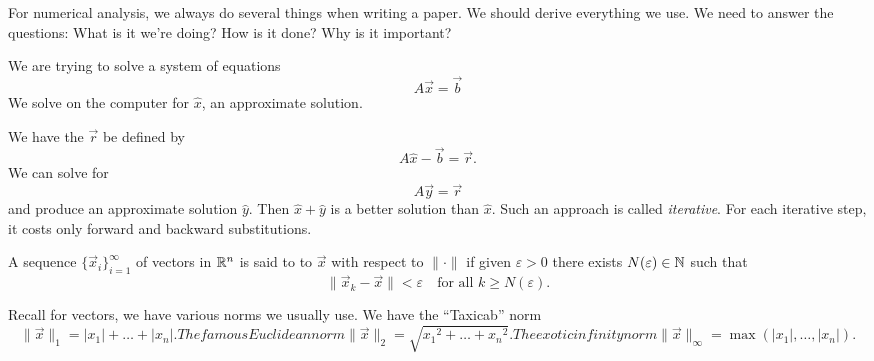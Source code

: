 For numerical analysis, we always do several things when writing a
paper. We should derive everything we use. We need to answer the
questions: What is it we're doing? How is it done? Why is it important?

We are trying to solve a system of equations
\begin{equation}
A\vec{x}=\vec{b}
\end{equation}
We solve on the computer for $\widehat{x}$, an approximate solution. 

We have the  $\vec{r}$ be defined by
\begin{equation}
A\widehat{x}-\vec{b}=\vec{r}.
\end{equation}
We can solve for
\begin{equation}
A\vec{y}=\vec{r}
\end{equation}
and produce an approximate solution $\widehat{y}$. Then
$\widehat{x}+\widehat{y}$ is a better solution than $\widehat{x}$. Such
an approach is called \emph{iterative}. For each iterative step, it
costs only forward and backward substitutions.

\begin{defn}
A sequence $\{\vec{x}_{i}\}^{\infty}_{i=1}$ of vectors in $\mathbb{R}^n$ is
said to  to $\vec{x}$ with respect to $\|\cdot\|$ if
given $\varepsilon>0$ there exists $N(\varepsilon)\in\mathbb{N}$ such that
\begin{equation}
\|\vec{x}_{k}-\vec{x}\|<\varepsilon\quad\mbox{for all }k\geq N(\varepsilon).
\end{equation}
\end{defn}

\M Recall for vectors, we have various norms we usually use. We have the
``Taxicab'' norm
\begin{subequations}
\begin{equation}
\|\vec{x}\|_{1} = |x_{1}|+\dots+|x_{n}|.
\end{equation}
The famous Euclidean norm
\begin{equation}
\|\vec{x}\|_{2} = \sqrt{{x_{1}}^{2}+\dots+{x_{n}}^{2}}.
\end{equation}
The exotic infinity norm
\begin{equation}
\|\vec{x}\|_{\infty} = \max(|x_{1}|,\dots,|x_{n}|).
\end{equation}
\end{subequations}

